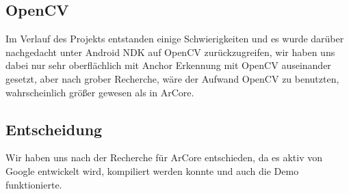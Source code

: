 \subsection{OpenCV}
Im Verlauf des Projekts entstanden einige Schwierigkeiten und es wurde darüber nachgedacht
unter Android NDK auf OpenCV zurückzugreifen, wir haben uns dabei nur sehr oberflächlich
mit Anchor Erkennung mit OpenCV auseinander gesetzt, aber nach grober Recherche, wäre der
Aufwand OpenCV zu benutzten, wahrscheinlich größer gewesen als in ArCore.

\subsection{Entscheidung}
Wir haben uns nach der Recherche für ArCore entschieden, da es aktiv von Google entwickelt
wird, kompiliert werden konnte und auch die Demo funktionierte.
